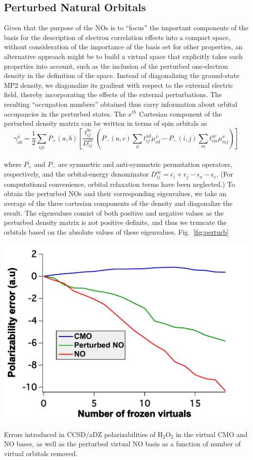 \subsection{Perturbed Natural Orbitals}

Given that the purpose of the NOs is to ``focus'' the important components of
the basis for the description of electron correlation effects into a compact
space, without consideration of the importance of the basis set for other
properties, an alternative approach might be to build a virtual space that
explicitly takes such properties into account, such as the inclusion of the
perturbed one-electron density in the definition of the space.  Instead of
diagonalizing the ground-state MP2 density, we diagonalize its gradient with
respect to the external electric field, thereby incorporating the effects of
the external perturbations.  The resulting ``occupation numbers'' obtained
thus carry information about orbital occupancies in the perturbed states.  The
$x^{th}$ Cartesian component of the perturbed density matrix can be written in
terms of spin orbitals as
\\
\begin{equation}
\gamma^x_{ab} = \frac{1}{2}\sum_{ijc}P_{+}(a,b)\left[\frac{t^{bc}_{ij}}{D^{ac}_{ij}} \
\left(P_{-}(a,c)\sum_dt^{ad}_{ij}\mu^x_{cd} - P_{-}(i,j)\sum_m t^{ac}_{im}\mu^x_{mj}\right)\right]
\label{Eq:perturb_d}
\end{equation}
\\
where $P_{+}$ and $P_{-}$ are symmetric and anti-symmetric permutation
operators, respectively, and the orbital-energy denominator $D^{ac}_{ij} =
\epsilon_i + \epsilon_j  -\epsilon_a -\epsilon_c $.  (For computational
convenience, orbital relaxation terms have been neglected.) To obtain the
perturbed NOs and their corresponding eigenvalues, we take an average of the
three cartesian components of the density and diagonalize the result.
The eigenvalues consist of both positive and negative values as the perturbed
density matrix is not positive definite, and thus we truncate the orbitals
based on the absolute values of these eigenvalues.
Fig.~\ref{fig:perturb} 
\begin{MyFigure}[h!]
\centering
\includegraphics[width=0.6\linewidth,natwidth=610,natheight=642]{figures_fvno/perturbed.pdf}
\caption{{\footnotesize Errors introduced in CCSD/aDZ polarizabilities of
H$_2$O$_2$ in the virtual CMO and NO bases, as well as the perturbed
virtual NO basis as a function of number of virtual orbitals removed.}}
\label{fig:perturb}
\end{MyFigure}
